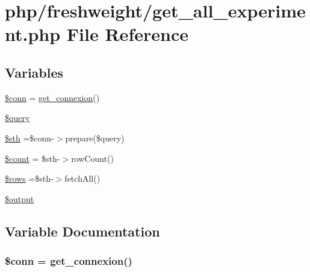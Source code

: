 \hypertarget{freshweight_2get__all__experiment_8php}{\section{php/freshweight/get\-\_\-all\-\_\-experiment.php File Reference}
\label{freshweight_2get__all__experiment_8php}
}
\subsection*{Variables}
\begin{DoxyCompactItemize}
\item 
\hyperlink{freshweight_2get__all__experiment_8php_aa8a5a87b9c1a6a0819b88447cbe41877}{\$conn} = \hyperlink{php__functions_8php_ace18bc10f3fd08f92688ac743e0d8c2e}{get\-\_\-connexion}()
\item 
\hyperlink{freshweight_2get__all__experiment_8php_af59a5f7cd609e592c41dc3643efd3c98}{\$query}
\item 
\hyperlink{freshweight_2get__all__experiment_8php_afa9126f9664959c02795be300a135f93}{\$sth} =\$conn-\/$>$prepare(\$query)
\item 
\hyperlink{freshweight_2get__all__experiment_8php_af789423037bbc89dc7c850e761177570}{\$count} = \$sth-\/$>$row\-Count()
\item 
\hyperlink{freshweight_2get__all__experiment_8php_ace2ec39e7df3899fa8df9640ec274b03}{\$rows} =\$sth-\/$>$fetch\-All()
\item 
\hyperlink{freshweight_2get__all__experiment_8php_a73004ce9cd673c1bfafd1dc351134797}{\$output}
\end{DoxyCompactItemize}


\subsection{Variable Documentation}
\hypertarget{freshweight_2get__all__experiment_8php_aa8a5a87b9c1a6a0819b88447cbe41877}{
\subsubsection[{\$conn}]{\setlength{\rightskip}{0pt plus 5cm}\$conn = {\bf get\-\_\-connexion}()}}\label{freshweight_2get__all__experiment_8php_aa8a5a87b9c1a6a0819b88447cbe41877}



